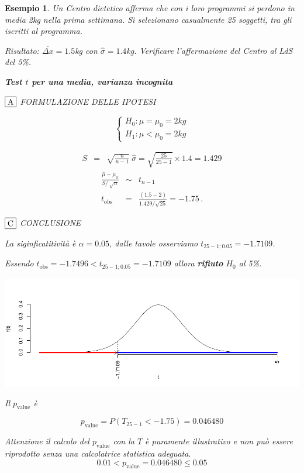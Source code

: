 \documentclass[
  11pt,
]{book}
\theoremstyle{mytheoremstyle}
\theoremstyle{mydefstyle}
\newtheorem{example}{{Esempio}}[section]
\begin{document}
\begin{example}
Un Centro dietetico afferma che con i loro programmi si perdono in media
2kg nella prima settimana. Si selezionano casualmente 25 soggetti, tra
gli iscritti al programma.

Risultato: \(\overline{\Delta x}=1.5\)kg con \(\hat\sigma=1.4\)kg.
Verificare l'affermazione del Centro al LdS del 5\%.

\textbf{Test \(t\) per una media, varianza incognita}

\(\fbox{A}\) FORMULAZIONE DELLE IPOTESI

\[\begin{cases}
   H_0: \mu = \mu_0=2kg \\
   H_1: \mu < \mu_0=2kg 
   \end{cases}\]

\begin{eqnarray*}
   S    &=& \sqrt{\frac{n} {n-1}}\ \widehat{\sigma} 
   =  \sqrt{\frac{ 25 } { 25 -1}} \times  1.4  =  1.429 
   \end{eqnarray*}
\begin{eqnarray*}
   \frac{\hat\mu - \mu_{0}} {S/\,\sqrt{n}}&\sim&t_{n-1}\\
   t_{\text{obs}}
   &=& \frac{ ( 1.5 -  2 )} { 1.429 /\sqrt{ 25 }}
   =   -1.75 \, .
   \end{eqnarray*}

\(\fbox{C}\) CONCLUSIONE

La siginficatitività è \(\alpha=0.05\), dalle tavole osserviamo \(t_{25-1;0.05}=-1.7109\).

Essendo \(t_\text{obs}=-1.7496<t_{25-1;0.05}=-1.7109\) allora \textbf{rifiuto} \(H_0\) al 5\%.

\begin{center}\includegraphics{Appunti_di_Statistica_2025_files/figure-latex/15-test-mu-pi-6,-1} \end{center}

Il \(p_{\text{value}}\) è

\[ p_{\text{value}} = P(T_{25-1}<-1.75)=0.046480 \]

Attenzione il calcolo del \(p_\text{value}\) con la \(T\) è puramente illustrativo e non può essere riprodotto senza una calcolatrice statistica adeguata.\[
 0.01 < p_\text{value}= 0.046480 \leq 0.05 
\]
\end{example}
\end{document}
